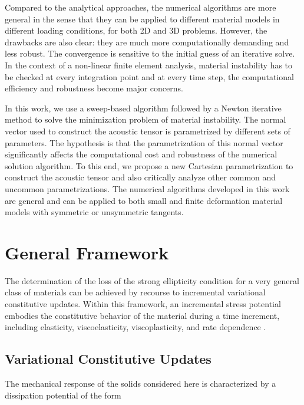 \documentclass[12pt]{article}
\numberwithin{equation}{section}
\begin{document}
Compared to the analytical approaches, the numerical algorithms are 
more general in the sense that they can be applied to different 
material models in different loading conditions, for both 2D and 3D 
problems. However, the drawbacks are also clear: they are much more 
computationally demanding and less robust. The convergence is 
sensitive to the initial guess of an iterative solve. In the context 
of a non-linear finite element analysis, material instability has to 
be checked at every integration point and at every time step, the 
computational efficiency and robustness become major concerns.

In this work, we use a sweep-based algorithm followed by a Newton 
iterative method to solve the minimization problem of material 
instability. The normal vector used to construct the acoustic tensor 
is parametrized by different sets of parameters. The hypothesis is 
that the parametrization of this normal vector significantly affects 
the computational cost and robustness of the numerical solution 
algorithm. To this end, we propose a new Cartesian parametrization to 
construct the acoustic tensor and also critically analyze other common 
and uncommon parametrizations. The numerical algorithms developed in 
this work are general and can be applied to both small and finite 
deformation material models with symmetric or unsymmetric tangents. 

\section{General Framework}

The determination of the loss of the strong ellipticity condition for
a very general class of materials can be achieved by recourse to
incremental variational constitutive updates. Within this framework,
an incremental stress potential embodies the constitutive behavior of
the material during a time increment, including elasticity,
viscoelasticity, viscoplasticity, and rate dependence
\citep{Ortiz.Stainier:1999, Lambrecht.etal:2003,
  Miehe.etal:2004, Weinberg.etal:2006,
  Fancello.etal:2006, Mosler.Bruhns:2010,
  Bleier.Mosler:2012}.

\subsection{Variational Constitutive Updates}

The mechanical response of the solids considered here is characterized
by a dissipation potential of the form
\end{document}
